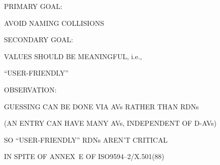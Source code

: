 \begin{bwslide}

\begin{nrtc}
\item	PRIMARY GOAL:
    \begin{nrtc}
    \item	AVOID NAMING COLLISIONS
    \end{nrtc}

\item	SECONDARY GOAL:
    \begin{nrtc}
    \item	VALUES SHOULD BE MEANINGFUL, i.e.,
	\begin{nrtc}
	\item	``USER-FRIENDLY''
	\end{nrtc}
    \end{nrtc}

\item	OBSERVATION:
    \begin{nrtc}
    \item	GUESSING CAN BE DONE VIA AVs RATHER THAN RDNs
	\begin{nrtc}
	\item	(AN ENTRY CAN HAVE MANY AVs, INDEPENDENT OF D-AVs)
	\end{nrtc}

    \item	SO ``USER-FRIENDLY'' RDNs AREN'T CRITICAL
	\begin{nrtc}
	\item	IN SPITE OF ANNEX~E OF ISO9594--2/X.501(88)
	\end{nrtc}
    \end{nrtc}
\end{nrtc}
\end{bwslide}


